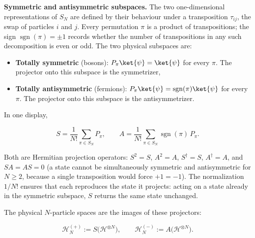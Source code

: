 \medskip\noindent\textbf{Symmetric and antisymmetric subspaces.}
The two one-dimensional representations of $S_N$ are defined by their behaviour under a transposition $\tau_{ij}$, the swap of particles $i$ and $j$. Every permutation $\pi$ is a product of transpositions; the sign $\operatorname{sgn}(\pi) = \pm 1$ records whether the number of transpositions in any such decomposition is even or odd. The two physical subspaces are:
\begin{itemize}
    \item \textbf{Totally symmetric} (bosons): $P_\pi\ket{\psi} = \ket{\psi}$ for every $\pi$. The projector onto this subspace is the symmetrizer,
    \item \textbf{Totally antisymmetric} (fermions): $P_\pi\ket{\psi} = \operatorname{sgn}(\pi)\ket{\psi}$ for every $\pi$. The projector onto this subspace is the antisymmetrizer.
\end{itemize}
In one display,
\begin{linenomath}
    \begin{equation}
        S = \frac{1}{N!}\sum_{\pi\in S_N} P_\pi,
        \qquad
        A = \frac{1}{N!}\sum_{\pi\in S_N} \operatorname{sgn}(\pi)\,P_\pi.
        \label{eq:symmetrizers}
    \end{equation}
\end{linenomath}
Both are Hermitian projection operators: $S^2 = S$, $A^2 = A$, $S^\dagger = S$, $A^\dagger = A$, and $SA = AS = 0$ (a state cannot be simultaneously symmetric and antisymmetric for $N \ge 2$, because a single transposition would force $+1 = -1$). The normalization $1/N!$ ensures that each reproduces the state it projects: acting on a state already in the symmetric subspace, $S$ returns the same state unchanged.

The physical $N$-particle spaces are the images of these projectors:
\begin{linenomath}
    \begin{equation*}
        \mathcal{H}_N^{(+)} := S\bigl(\mathcal{H}^{\otimes N}\bigr),
        \qquad
        \mathcal{H}_N^{(-)} := A\bigl(\mathcal{H}^{\otimes N}\bigr).
    \end{equation*}
\end{linenomath}

